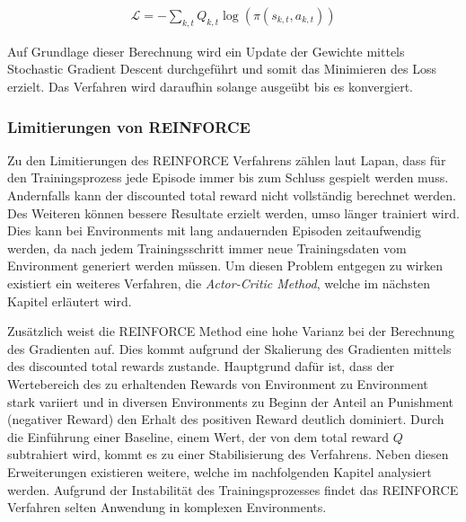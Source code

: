 \documentclass[11pt]{scrartcl}
\begin{document}
\begin{align}
\mathcal{L}=-\sum_{k,t}Q_{k,t}\log(\pi(s_{k,t},a_{k,t}))
\label{aln:reinforce-loss}
\end{align}

Auf Grundlage dieser Berechnung wird ein Update der Gewichte mittels Stochastic
Gradient Descent durchgeführt und somit das Minimieren des Loss erzielt. Das Verfahren
wird daraufhin solange ausgeübt bis es konvergiert.

\subsubsection{Limitierungen von REINFORCE}
\label{sec:limit-reinforce}
Zu den Limitierungen des REINFORCE Verfahrens zählen laut Lapan\cite[~S.252]{L2018}, dass für den
Trainingsprozess jede Episode immer bis zum Schluss gespielt werden muss. Andernfalls kann der
discounted total reward nicht vollständig berechnet werden. Des Weiteren können bessere Resultate
erzielt werden, umso länger trainiert wird. Dies kann bei Environments mit lang andauernden Episoden
zeitaufwendig werden, da nach jedem Trainingsschritt immer neue Trainingsdaten vom Environment
generiert werden müssen. Um diesen Problem entgegen zu wirken existiert ein weiteres Verfahren, die
\textit{Actor-Critic Method}, welche im nächsten Kapitel erläutert wird. 

Zusätzlich weist die REINFORCE Method eine hohe Varianz bei der Berechnung des Gradienten auf.
Dies kommt aufgrund der Skalierung des Gradienten mittels des discounted total rewards zustande.
Hauptgrund dafür ist, dass der Wertebereich des zu erhaltenden Rewards von Environment zu Environment
stark variiert und in diversen Environments zu Beginn der Anteil an Punishment (negativer Reward) den
Erhalt des positiven Reward deutlich dominiert. Durch die Einführung einer Baseline, einem Wert, der
von dem total reward $Q$ subtrahiert wird, kommt es zu einer Stabilisierung des Verfahrens. Neben
diesen Erweiterungen existieren weitere, welche im nachfolgenden Kapitel analysiert werden. Aufgrund
der Instabilität des Trainingsprozesses findet das REINFORCE Verfahren selten Anwendung in komplexen
Environments.   
\newpage
\end{document}

